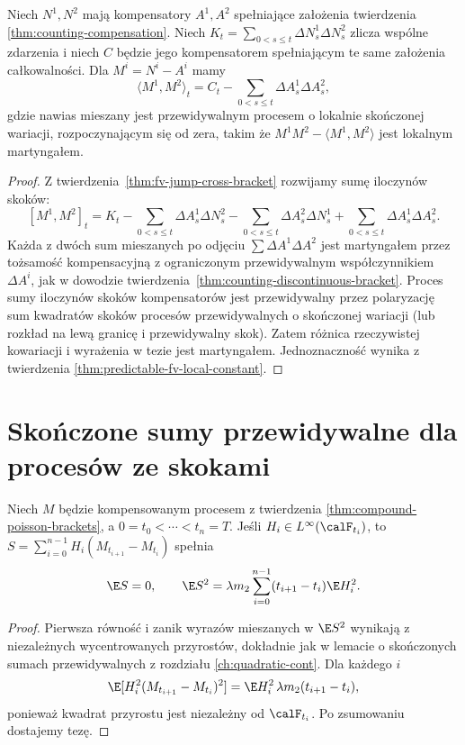 \begin{wniosek}
\label{cor:counting-cross-compensator}
Niech $N^1,N^2$ mają kompensatory $A^1,A^2$
spełniające założenia twierdzenia
\ref{thm:counting-compensation}.
Niech $K_t=\sum_{0<s\le t}\Delta N_s^1\Delta N_s^2$
zlicza wspólne zdarzenia i niech $C$ będzie
jego kompensatorem spełniającym te same
założenia całkowalności. Dla $M^i=N^i-A^i$
mamy
\[
\langle M^1,M^2\rangle_t
=C_t-\sum_{0<s\le t}\Delta A_s^1\Delta A_s^2,
\]
gdzie nawias mieszany jest przewidywalnym
procesem o lokalnie skończonej wariacji,
rozpoczynającym się od zera, takim że
$M^1M^2-\langle M^1,M^2\rangle$ jest
lokalnym martyngałem.
\end{wniosek}
\begin{proof}
Z twierdzenia~\ref{thm:fv-jump-cross-bracket}
rozwijamy sumę iloczynów skoków:
\[
[M^1,M^2]_t=K_t
-\sum_{0<s\le t}\Delta A_s^1\Delta N_s^2
-\sum_{0<s\le t}\Delta A_s^2\Delta N_s^1
+\sum_{0<s\le t}\Delta A_s^1\Delta A_s^2 .
\]
Każda z dwóch sum mieszanych po odjęciu
$\sum\Delta A^1\Delta A^2$ jest martyngałem
przez tożsamość kompensacyjną z ograniczonym
przewidywalnym współczynnikiem $\Delta A^i$,
jak w dowodzie
twierdzenia~\ref{thm:counting-discontinuous-bracket}.
Proces sumy iloczynów skoków kompensatorów
jest przewidywalny przez polaryzację sum
kwadratów skoków procesów przewidywalnych
o skończonej wariacji (lub rozkład na
lewą granicę i przewidywalny skok).
Zatem różnica rzeczywistej kowariacji
i wyrażenia w tezie jest martyngałem.
Jednoznaczność wynika z twierdzenia
\ref{thm:predictable-fv-local-constant}.
\end{proof}

\section{Skończone sumy przewidywalne dla procesów ze skokami}
\begin{twierdzenie}
\label{thm:compound-poisson-isometry}
Niech $M$ będzie kompensowanym procesem z twierdzenia
\ref{thm:compound-poisson-brackets}, a $0=t_0<\cdots<t_n=T$.
Jeśli $H_i\in L^\infty(\calF_{t_i})$, to
$S=\sum_{i=0}^{n-1}H_i(M_{t_{i+1}}-M_{t_i})$
spełnia
\[
\E S=0,\qquad
\E S^2=\lambda m_2\sum_{i=0}^{n-1}
(t_{i+1}-t_i)\E H_i^2.
\]
\end{twierdzenie}
\begin{proof}
Pierwsza równość i zanik wyrazów mieszanych w
$\E S^2$ wynikają z niezależnych wycentrowanych
przyrostów, dokładnie jak w lemacie o skończonych
sumach przewidywalnych z rozdziału
\ref{ch:quadratic-cont}. Dla każdego $i$
\[
\E[H_i^2(M_{t_{i+1}}-M_{t_i})^2]
=\E H_i^2\,\lambda m_2(t_{i+1}-t_i),
\]
ponieważ kwadrat przyrostu jest niezależny od
$\calF_{t_i}$. Po zsumowaniu dostajemy tezę.
\end{proof}

